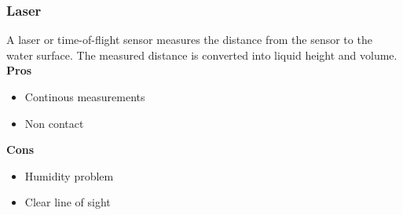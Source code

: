 \subsubsection{Laser}
A laser or time-of-flight sensor measures the distance from the sensor to the water surface.
The measured distance is converted into liquid height and volume. \\
\noindent\textbf{Pros}
    \begin{itemize}
    \item Continous measurements
    \item Non contact
    \end{itemize}
\noindent\textbf{Cons}
    \begin{itemize}
    \item Humidity problem
    \item Clear line of sight
    \end{itemize}
